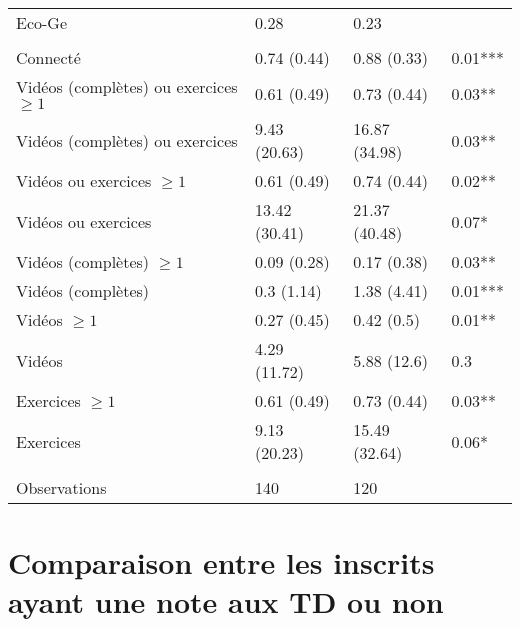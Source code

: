 \documentclass[
]{book}
\begin{document}
\begin{ThreePartTable}
\begin{longtable}[t]{llll}
\hspace{1em}Eco-Ge & 0.28 & 0.23 & \\
\addlinespace[0.3em]
\multicolumn{4}{l}{\textbf{Plateforme}}\\
\hspace{1em}Connecté & 0.74 (0.44) & 0.88 (0.33) & 0.01***\\
\hspace{1em}Vidéos (complètes) ou exercices $\geq 1$ & 0.61 (0.49) & 0.73 (0.44) & 0.03**\\
\hspace{1em}Vidéos (complètes) ou exercices & 9.43 (20.63) & 16.87 (34.98) & 0.03**\\
\hspace{1em}Vidéos ou exercices $\geq 1$ & 0.61 (0.49) & 0.74 (0.44) & 0.02**\\
\hspace{1em}Vidéos ou exercices & 13.42 (30.41) & 21.37 (40.48) & 0.07*\\
\hspace{1em}Vidéos (complètes) $\geq 1$ & 0.09 (0.28) & 0.17 (0.38) & 0.03**\\
\hspace{1em}Vidéos (complètes) & 0.3 (1.14) & 1.38 (4.41) & 0.01***\\
\hspace{1em}Vidéos $\geq 1$ & 0.27 (0.45) & 0.42 (0.5) & 0.01**\\
\hspace{1em}Vidéos & 4.29 (11.72) & 5.88 (12.6) & 0.3\\
\hspace{1em}Exercices $\geq 1$ & 0.61 (0.49) & 0.73 (0.44) & 0.03**\\
\hspace{1em}Exercices & 9.13 (20.23) & 15.49 (32.64) & 0.06*\\
\addlinespace[0.3em]
\multicolumn{4}{l}{\textbf{ }}\\
\hspace{1em}Observations & 140 & 120 & \\*
\end{longtable}
\end{ThreePartTable}
\endgroup{}

\newpage

\setcounter{table}{0}
\setcounter{figure}{0}

\hypertarget{g20compinscvenutd0venutd1}{%
\section{Comparaison entre les inscrits ayant une note aux TD ou non}\label{g20compinscvenutd0venutd1}}
\end{document}
